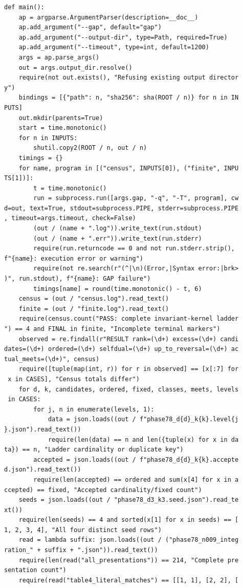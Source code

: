 \documentclass[
  11pt,
  a4paper,
]{article}
\begin{document}
\begin{verbatim}
def main():
    ap = argparse.ArgumentParser(description=__doc__)
    ap.add_argument("--gap", default="gap")
    ap.add_argument("--output-dir", type=Path, required=True)
    ap.add_argument("--timeout", type=int, default=1200)
    args = ap.parse_args()
    out = args.output_dir.resolve()
    require(not out.exists(), "Refusing existing output director
y")
    bindings = [{"path": n, "sha256": sha(ROOT / n)} for n in IN
PUTS]
    out.mkdir(parents=True)
    start = time.monotonic()
    for n in INPUTS:
        shutil.copy2(ROOT / n, out / n)
    timings = {}
    for name, program in [("census", INPUTS[0]), ("finite", INPU
TS[1])]:
        t = time.monotonic()
        run = subprocess.run([args.gap, "-q", "-T", program], cw
d=out, text=True, stdout=subprocess.PIPE, stderr=subprocess.PIPE
, timeout=args.timeout, check=False)
        (out / (name + ".log")).write_text(run.stdout)
        (out / (name + ".err")).write_text(run.stderr)
        require(run.returncode == 0 and not run.stderr.strip(), 
f"{name}: execution error or warning")
        require(not re.search(r"(^|\n)(Error,|Syntax error:|brk>
)", run.stdout), f"{name}: GAP failure")
        timings[name] = round(time.monotonic() - t, 6)
    census = (out / "census.log").read_text()
    finite = (out / "finite.log").read_text()
    require(census.count("PASS: complete invariant-kernel ladder
") == 4 and FINAL in finite, "Incomplete terminal markers")
    observed = re.findall(r"RESULT rank=(\d+) excess=(\d+) candi
dates=(\d+) ordered=(\d+) selfdual=(\d+) up_to_reversal=(\d+) ac
tual_meets=(\d+)", census)
    require([tuple(map(int, r)) for r in observed] == [x[:7] for
 x in CASES], "Census totals differ")
    for d, k, candidates, ordered, fixed, classes, meets, levels
 in CASES:
        for j, n in enumerate(levels, 1):
            data = json.loads((out / f"phase78_d{d}_k{k}.level{j
}.json").read_text())
            require(len(data) == n and len({tuple(x) for x in da
ta}) == n, "Ladder cardinality or duplicate key")
        accepted = json.loads((out / f"phase78_d{d}_k{k}.accepte
d.json").read_text())
        require(len(accepted) == ordered and sum(x[4] for x in a
ccepted) == fixed, "Accepted cardinality/fixed count")
    seeds = json.loads((out / "phase78_d3_k3.seed.json").read_te
xt())
    require(len(seeds) == 4 and sorted(x[1] for x in seeds) == [
1, 2, 3, 4], "All four distinct seed rows")
    read = lambda suffix: json.loads((out / ("phase78_n009_integ
ration_" + suffix + ".json")).read_text())
    require(len(read("all_presentations")) == 214, "Complete pre
sentation count")
    require(read("table4_literal_matches") == [[1, 1], [2, 2], [

\end{verbatim}
\end{document}
